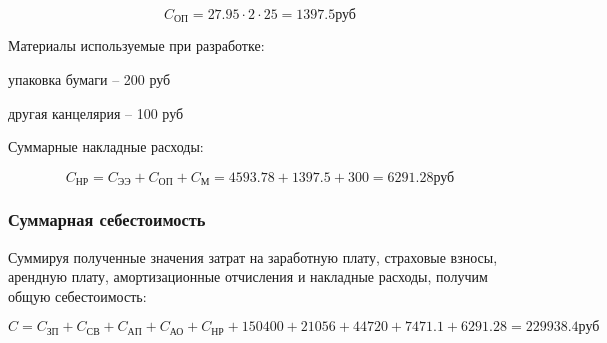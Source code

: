 $$ C_\text{ОП} = 27.95 \cdot 2 \cdot 25 = 1397.5 \text{руб} $$

\vspace{1em}

Материалы используемые при разработке: 
\begin{mintemize}
\item упаковка бумаги -- 200 руб
\item другая канцелярия -- 100 руб
\end{mintemize}

\vspace{1em}

Суммарные накладные расходы:

$$ C_\text{НР} = C_\text{ЭЭ} + C_\text{ОП} + C_\text{М}
= 4593.78 + 1397.5 + 300 = 6291.28 \text{руб} $$ 

\subsubsection{Суммарная себестоимость}

Суммируя полученные значения затрат на заработную плату, страховые
взносы, арендную плату, амортизационные отчисления и накладные расходы,
получим общую себестоимость:

$$ C = C_\text{ЗП} + C_\text{СВ} + C_\text{АП} + C_\text{АО} + C_\text{НР} +
150400 + 21056 + 44720 + 7471.1 + 6291.28 = 229938.4 \text{руб} $$ 
